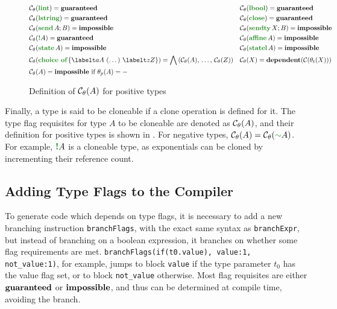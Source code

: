 \begin{figure}
    \centering
    \[\begin{aligned}
        &\iscloneable{\lintt} = \guaranteed && \iscloneable{\lboolt} = \guaranteed \\
        &\iscloneable{\lstringt} = \guaranteed && \iscloneable{\closet{}} = \guaranteed \\
        &\iscloneable{\sendt{A}{B}} = \impossible && \iscloneable{\sendtyt{X}{B}} = \impossible \\
        &\iscloneable{\bangt A} = \guaranteed && \iscloneable{\affinet A} = \impossible \\
        &\iscloneable{\statet A} = \impossible && \iscloneable{\statelt A} = \impossible \\
        &\iscloneable{\choicet{\labelt a A\ (\dots)\ \labelt z Z}} = \bigwedge\,(\iscloneable{A},\,\dots,\,\iscloneable{Z}) && \iscloneable{X} = \dependent{\depiscloneable{\typeidof{\typeenv}{X}}} \\
        &\iscloneable{A} = \impossible \text{ if } \polarityof{\typeenv}{A} = - \\
    \end{aligned}\]
    \vspace{-1em}
    \caption{Definition of $\mathcal{C}_\theta(A)$ for positive types}
    \label{fig:IsCloneableDefinition}
\end{figure}

Finally, a type is said to be cloneable if a clone operation is defined for it. The type flag requisites for type $A$ to be cloneable are denoted as $\mathcal{C}_\theta(A)$, and their definition for positive types is shown in . For negative types, $\iscloneable{A} = \iscloneable{\dualt A}$. For example, $\bangt{A}$ is a cloneable type, as exponentials can be cloned by incrementing their reference count. 

\subsection{Adding Type Flags to the Compiler}

To generate code which depends on type flags, it is necessary to add a new branching instruction \texttt{branchFlags}, with the exact same syntax as \texttt{branchExpr}, but instead of branching on a boolean expression, it branches on whether some flag requirements are met. \texttt{branchFlags(if(t0.value), value:1, not\_value:1)}, for example, jumps to block \texttt{value} if the type parameter $t_0$ has the value flag set, or to block \texttt{not\_value} otherwise. Most flag requisites are either $\mathbf{guaranteed}$ or $\mathbf{impossible}$, and thus can be determined at compile time, avoiding the branch.

